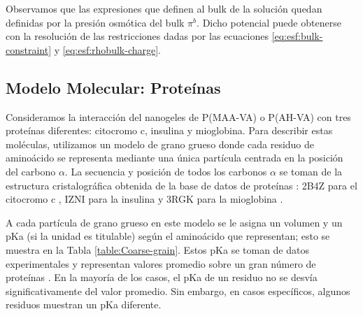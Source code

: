 Observamos que las expresiones que definen al bulk de la soluci\'on quedan definidas por la presi\'on osm\'otica del bulk $\pi^b$. Dicho potencial puede obtenerse con la resoluci\'on de las restricciones dadas por las  ecuaciones  \ref{eq:esf:bulk-constraint} y \ref{eq:esf:rhobulk-charge}.



\subsection{Modelo Molecular: Prote\'inas}\label{subsec:protein}



Consideramos la interacci\'on del nanogeles de P(MAA-VA) o P(AH-VA) con tres prote\'inas diferentes: citocromo c, insulina y mioglobina.
Para describir estas mol\'eculas, utilizamos un modelo de grano grueso donde cada residuo de amino\'acido se representa mediante una \'unica part\'icula centrada en la posici\'on del carbono $\alpha$.
La secuencia y posici\'on de todos los carbonos $\alpha$ se toman de la estructura cristalogr\'afica obtenida de la base de datos de prote\'inas \cite{berman2000protein}: 2B4Z para el citocromo c \cite{mirkin2008high}, IZNI para la insulina \cite{bentley1976structure} y 3RGK para la mioglobina \cite{hubbard1990x}.

A cada part\'icula de grano grueso en este modelo se le asigna un volumen y un pKa (si la unidad es titulable) seg\'un el amino\'acido que representan; esto se muestra en la Tabla \ref{table:Coarse-grain}.
Estos pKa se toman de datos experimentales y representan valores promedio sobre un gran n\'umero de prote\'inas \cite{grimsley2009summary}.
En la mayor\'ia de los casos, el pKa de un residuo no se desv\'ia significativamente del valor promedio.
Sin embargo, en casos espec\'ificos, algunos residuos muestran un pKa diferente.


